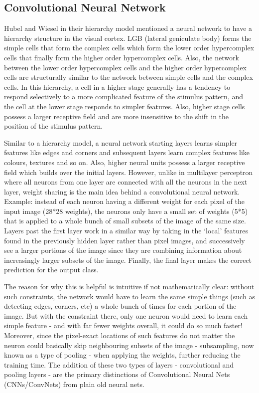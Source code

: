 \subsection{Convolutional Neural Network}

Hubel and Wiesel in their hierarchy model mentioned a neural network to have a hierarchy structure in the visual cortex. LGB (lateral geniculate body) forms the simple cells that form the complex cells which form the lower order hypercomplex cells that finally form the higher order hypercomplex cells.
Also, the network between the lower order hypercomplex cells and the higher order hypercomplex cells are structurally similar to the network between simple cells and the complex cells. In this hierarchy, a cell in a higher stage generally has a tendency to respond selectively to a more complicated feature of the stimulus pattern, and the cell at the lower stage responds to simpler features. Also, higher stage cells possess a larger receptive field and are more insensitive to the shift in the position of the stimulus pattern.

Similar to a hierarchy model, a neural network starting layers learns simpler features like edges and corners and subsequent layers learn complex features like colours, textures and so on. Also, higher neural units possess a larger receptive field which builds over the initial layers. However, unlike in multilayer perceptron where all neurons from one layer are connected with all the neurons in the next layer, weight sharing is the main idea behind a convolutional neural network. 
Example: instead of each neuron having a different weight for each pixel of the input image (28*28 weights), the neurons only have a small set of weights (5*5) that is applied to a whole bunch of small subsets of the image of the same size. Layers past the first layer work in a similar way by taking in the ‘local’ features found in the previously hidden layer rather than pixel images, and successively see a larger portions of the image since they are combining information about increasingly larger subsets of the image. Finally, the final layer makes the correct prediction for the output class.

The reason for why this is helpful is intuitive if not mathematically clear: without such constraints, the network would have to learn the same simple things (such as detecting edges, corners, etc) a whole bunch of times for each portion of the image. But with the constraint there, only one neuron would need to learn each simple feature - and with far fewer weights overall, it could do so much faster! Moreover, since the pixel-exact locations of such features do not matter the neuron could basically skip neighbouring subsets of the image - subsampling, now known as a type of pooling - when applying the weights, further reducing the training time. The addition of these two types of layers - convolutional and pooling layers - are the primary distinctions of Convolutional Neural Nets (CNNs/ConvNets) from plain old neural nets.


